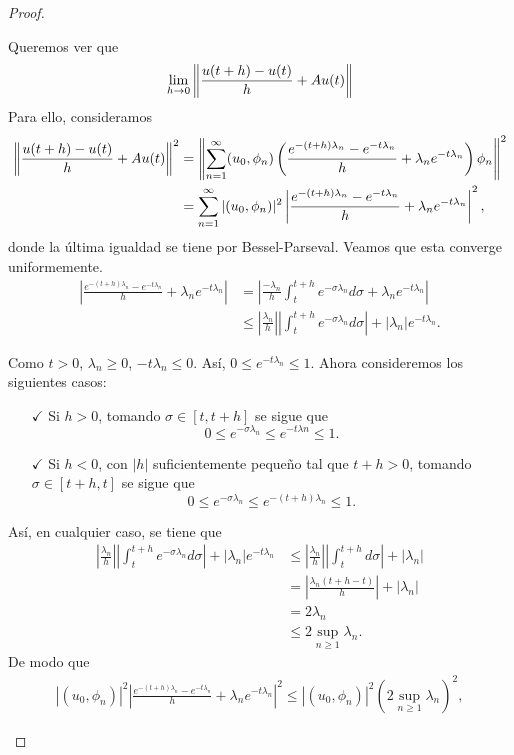 \begin{proof}
\begin{enumerate}
Queremos ver que
\[\lim_{h\rightarrow0}\left\|\frac{u(t+h)-u(t)}{h}+Au(t)\right\|\]
Para ello, consideramos
\begin{align*}
\left\|\frac{u(t+h)-u(t)}{h}+Au(t)\right\|^2&=\left\|\sum_{n=1}^{\infty}(u_{0},\phi_{n})\left(\frac{e^{-(t+h)\lambda_{n}}-e^{-t\lambda_{n}}}{h}+\lambda_{n}e^{-t\lambda_{n}}\right)\phi_{n}\right\|^{2}\\&=\sum_{n=1}^{\infty}|(u_{0},\phi_{n})|^{2}\left|\frac{e^{-(t+h)\lambda_{n}}-e^{-t\lambda_{n}}}{h}+\lambda_{n}e^{-t\lambda_{n}}\right|^{2},
\end{align*}
donde la última igualdad se tiene por Bessel-Parseval.
Veamos que esta converge uniformemente.
\begin{align*}
  \left|\frac{e^{-(t+h)\lambda_{n}}-e^{-t\lambda_{n}}}{h}+\lambda_{n}e^{-t\lambda_{n}}\right|
&=\left|\frac{-\lambda_{n}}{h}\int_{t}^{t+h}e^{-\sigma\lambda_{n}}d\sigma+\lambda_{n}e^{-t\lambda_{n}}\right| \\
&\le\left|\frac{\lambda_{n}}{h}\right|\left|\int_{t}^{t+h}e^{-\sigma\lambda_{n}}d\sigma\right|+\left|\lambda_{n}\right|e^{-t\lambda_{n}}.  
\end{align*}


Como $t>0$, $\lambda_n \ge 0$, $-t\lambda_{n}\le0$. Así, $0\le e^{-t\lambda_n}\le1$.
Ahora consideremos los siguientes casos:
\begin{enumerate}
    \item[$\checkmark$] Si $h>0$, tomando $\sigma \in [t, t+h]$ se sigue que \[0\le e^{-\sigma\lambda_{n}}\le e^{-t\lambda n}\le1.\]
    \item[$\checkmark$] Si $h<0$, con $|h|$ suficientemente pequeño tal que $t+h>0$, tomando $\sigma \in [t+h, t]$ se sigue que \[0\le e^{-\sigma\lambda_{n}}\le e^{-(t+h)\lambda_{n}}\le1. \]
\end{enumerate}
Así, en cualquier caso, se tiene que
\begin{align*}
\left|\frac{\lambda_n}{h}\right|\left|\int_{t}^{t+h}e^{-\sigma\lambda_n}d\sigma\right|+|\lambda_n|e^{-t\lambda_n}
&\le\left|\frac{\lambda_{n}}{h}\right|\left|\int_{t}^{t+h}d\sigma\right|+|\lambda_{n}|
\\&=\left|\frac{\lambda_{n}(t+h-t)}{h}\right|+|\lambda_{n}|\\&=2\lambda_{n}\\&\le2\sup_{n\ge1}\lambda_{n}.
\end{align*}
De modo que
\begin{align}
|(u_{0},\phi_{n})|^{2}\left|\frac{e^{-(t+h)\lambda_{n}}-e^{-t\lambda_{n}}}{h}+\lambda_{n}e^{-t\lambda_{n}}\right|^{2}\le|(u_{0},\phi_{n})|^{2}(2\sup_{n\ge1}\lambda_{n})^{2}, \label{1}    
\end{align}


\end{enumerate}
\end{proof}
